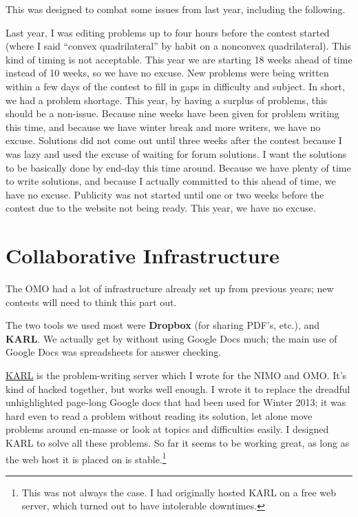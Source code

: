 \documentclass[11pt]{scrreprt}
\begin{document}
This was designed to combat some issues from last year, including the following.
\begin{itemize}
  \ii Last year, I was editing problems up to four hours before the contest started (where I said ``convex quadrilateral'' by habit on a nonconvex quadrilateral). This kind of timing is not acceptable. This year we are starting 18 weeks ahead of time instead of 10 weeks, so we have no excuse.
  \ii New problems were being written within a few days of the contest to fill in gaps in difficulty and subject. In short, we had a problem shortage. This year, by having a surplus of problems, this should be a non-issue. Because nine weeks have been given for problem writing this time, and because we have winter break and more writers, we have no excuse.
  \ii Solutions did not come out until three weeks after the contest because I was lazy and used the excuse of waiting for forum solutions. I want the solutions to be basically done by end-day this time around. Because we have plenty of time to write solutions, and because I actually committed to this ahead of time, we have no excuse.
  \ii Publicity was not started until one or two weeks before the contest due to the website not being ready. This year, we have no excuse.
\end{itemize}

\section{Collaborative Infrastructure}
The OMO had a lot of infrastructure already set up from previous years; new contests will need to think this part out.

The two tools we used most were \textbf{Dropbox} (for sharing PDF's, etc.), and \textbf{KARL}.  We actually get by without using Google Docs much; the main use of Google Docs was spreadsheets for answer checking.

\href{https://github.com/vEnhance/karl}{KARL} is the problem-writing server which I wrote for the NIMO and OMO.  It's kind of hacked together, but works well enough.  I wrote it to replace the dreadful unhighlighted page-long Google docs that had been used for Winter 2013; it was hard even to read a problem without reading its solution, let alone move problems around en-masse or look at topics and difficulties easily.  I designed KARL to solve all these problems.  So far it seems to be working great, as long as the web host it is placed on is stable.\footnote{This was not always the case. I had originally hosted KARL on a free web server, which turned out to have intolerable downtimes.}
\end{document}
